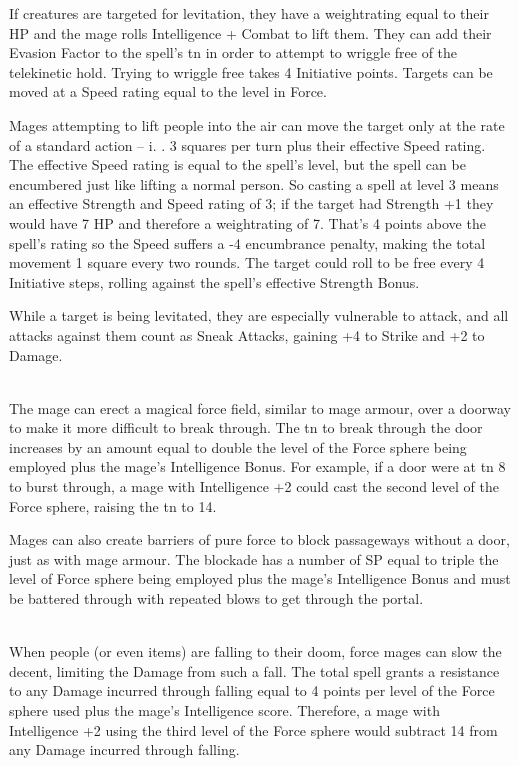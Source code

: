\begin{multicols}{2}
If creatures are targeted for levitation, they have a \gls{weightrating} equal to their HP and the mage rolls Intelligence + Combat to lift them.
They can add their Evasion Factor to the spell's \gls{tn} in order to attempt to wriggle free of the telekinetic hold.
Trying to wriggle free takes 4 Initiative points.
Targets can be moved at a Speed rating equal to the level in Force.

Mages attempting to lift people into the air can move the target only at the rate of a standard action -- i.
. 3 squares per turn plus their effective Speed rating.
The effective Speed rating is equal to the spell's level, but the spell can be encumbered just like lifting a normal person.
So casting a spell at level 3 means an effective Strength and Speed rating of 3; if the target had Strength +1 they would have 7 HP and therefore a \gls{weightrating} of 7.
That's 4 points above the spell's rating so the Speed suffers a -4 encumbrance penalty, making the total movement 1 square every two \glspl{round}.
The target could roll to be free every 4 Initiative steps, rolling against the spell's effective Strength Bonus.

While a target is being levitated, they are especially vulnerable to attack, and all attacks against them count as Sneak Attacks, gaining +4 to Strike and +2 to Damage.

\\
The mage can erect a magical force field, similar to mage armour, over a doorway to make it more difficult to break through.
The \gls{tn} to break through the door increases by an amount equal to double the level of the Force sphere being employed plus the mage's Intelligence Bonus.
For example, if a door were at \gls{tn} 8 to burst through, a mage with Intelligence +2 could cast the second level of the Force sphere, raising the \gls{tn} to 14.

Mages can also create barriers of pure force to block passageways without a door, just as with mage armour.
The blockade has a number of \gls{SP} equal to triple the level of Force sphere being employed plus the mage's Intelligence Bonus and must be battered through with repeated blows to get through the portal.

\\
When people (or even items) are falling to their doom, force mages can slow the decent, limiting the Damage from such a fall.
The total spell grants a resistance to any Damage incurred through falling equal to 4 points per level of the Force sphere used plus the mage's Intelligence score.
Therefore, a mage with Intelligence +2 using the third level of the Force sphere would subtract 14 from any Damage incurred through falling.


\end{multicols}
